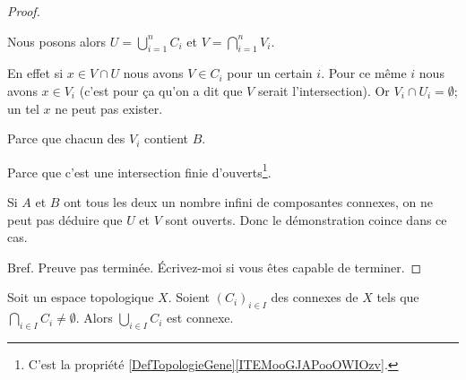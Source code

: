\begin{proof}
\begin{subproof}
		Nous posons alors \( U=\bigcup_{i=1}^n C_i\) et \( V=\bigcap_{i=1}^nV_i\).
		\begin{subproof}
			\spitem[\( V\cap U=\emptyset\)]
			En effet si \( x\in V\cap U\) nous avons \( V\in C_i\) pour un certain \( i\). Pour ce même \( i\) nous avons \( x\in V_i\) (c'est pour ça qu'on a dit que \( V\) serait l'intersection). Or \( V_i\cap U_i=\emptyset\); un tel \( x\) ne peut pas exister.

			Parce que chacun des \( V_i\) contient \( B\).

			Parce que c'est une intersection finie d'ouverts\footnote{C'est la propriété \ref{DefTopologieGene}\ref{ITEMooGJAPooOWIOzv}.}.
		\end{subproof}
		\spitem[Le problème]
		Si \( A\) et \( B\) ont tous les deux un nombre infini de composantes connexes, on ne peut pas déduire que \( U\) et \( V\) sont ouverts. Donc le démonstration coince dans ce cas.
	\end{subproof}
	Bref. Preuve pas terminée. Écrivez-moi si vous êtes capable de terminer.
\end{proof}


\begin{proposition}		\label{PROPooBCFXooRlMvch}
	Soit un espace topologique \( X\). Soient \( (C_i)_{i\in I}\) des connexes de \( X\) tels que \( \bigcap_{i\in I}C_i\neq \emptyset\). Alors \( \bigcup_{i\in I}C_i\) est connexe.
\end{proposition}


